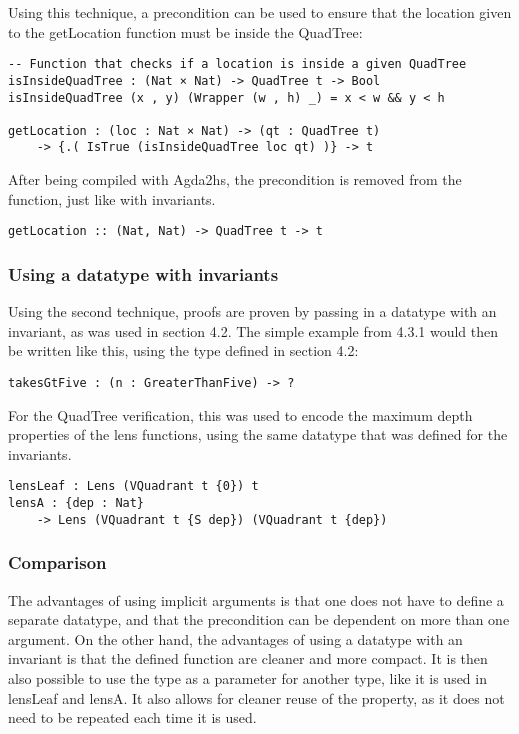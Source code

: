 Using this technique, a precondition can be used to ensure that the location given to the getLocation function must be inside the QuadTree:
\begin{verbatim}
-- Function that checks if a location is inside a given QuadTree
isInsideQuadTree : (Nat × Nat) -> QuadTree t -> Bool
isInsideQuadTree (x , y) (Wrapper (w , h) _) = x < w && y < h

getLocation : (loc : Nat × Nat) -> (qt : QuadTree t) 
    -> {.( IsTrue (isInsideQuadTree loc qt) )} -> t
\end{verbatim}
After being compiled with Agda2hs, the precondition is removed from the function, just like with invariants.
\begin{verbatim}
getLocation :: (Nat, Nat) -> QuadTree t -> t
\end{verbatim}

\subsubsection{Using a datatype with invariants}
Using the second technique, proofs are proven by passing in a datatype with an invariant, as was used in section 4.2. The simple example from 4.3.1 would then be written like this, using the type defined in section 4.2:
\begin{verbatim}
takesGtFive : (n : GreaterThanFive) -> ?
\end{verbatim}

For the QuadTree verification, this was used to encode the maximum depth properties of the lens functions, using the same datatype that was defined for the invariants.
\begin{verbatim}
lensLeaf : Lens (VQuadrant t {0}) t
lensA : {dep : Nat} 
    -> Lens (VQuadrant t {S dep}) (VQuadrant t {dep})
\end{verbatim}

\subsubsection{Comparison}
The advantages of using implicit arguments is that one does not have to define a separate datatype, and that the precondition can be dependent on more than one argument. On the other hand, the advantages of using a datatype with an invariant is that the defined function are cleaner and more compact. It is then also possible to use the type as a parameter for another type, like it is used in lensLeaf and lensA. It also allows for cleaner reuse of the property, as it does not need to be repeated each time it is used.

